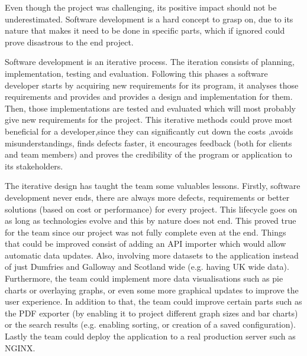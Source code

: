 \documentclass{l3proj}
\begin{document}
Even though the project was challenging, its positive impact should not be underestimated. Software development is a hard
concept to grasp on, due to its  nature that makes it need to be done in specific parts, which if ignored could prove
disastrous to the end project.

Software development is an iterative process. The iteration consists of planning, implementation, testing and evaluation.
Following this phases a software developer  starts by acquiring new requirements for its program, it analyses those
requirements and provides and provides a design and implementation for them. Then, those implementations are tested and
evaluated which will most probably give new requirements for the project. This iterative methods could prove most
beneficial for a developer,since they can significantly cut down the costs ,avoids misunderstandings, finds defects
faster, it encourages feedback (both for clients and team members) and proves the credibility of the program or
application to its stakeholders.

The iterative design has taught the team some valuables lessons. Firstly, software development never ends, there are
always more defects, requirements or better solutions (based on cost or performance) for every project. This lifecycle goes
on as long as technologies evolve and this by nature does not end. This proved true for the team since our project was
not fully complete even at the end. Things that could be improved consist of adding an API importer which would allow
automatic data updates. Also, involving more datasets to the application instead of just Dumfries and Galloway and
Scotland wide (e.g. having UK wide data). Furthermore, the team could implement more data visualisations such as pie charts
or overlaying graphs, or even some more graphical updates to improve the user experience. In addition to that, the team could
improve certain parts such as the PDF exporter (by enabling it to project different graph sizes and bar charts) or the
search results (e.g. enabling sorting, or creation of a saved configuration). Lastly the team could deploy the application to a
real production server such as NGINX.



\end{document}
